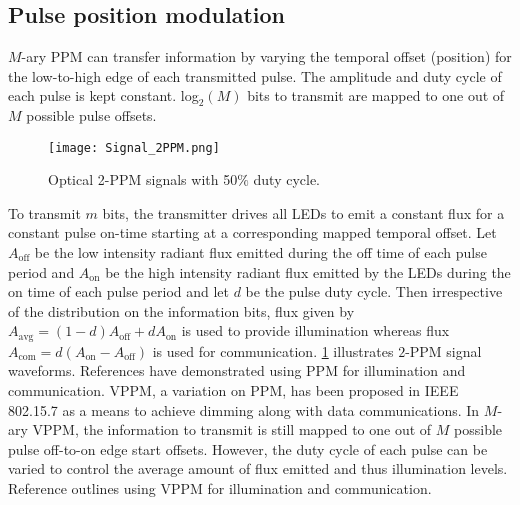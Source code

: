 \subsection{Pulse position modulation}
\label{subsec:sisoModulationPPM}
$M$-ary PPM can transfer information by varying the temporal offset (position) for the low-to-high edge of each transmitted pulse. The amplitude and duty cycle of each pulse is kept constant. log$^{ }_{2}(M)$ bits to transmit are mapped to one out of $M$ possible pulse offsets. 
\begin{figure}[!t]
	\centering
		\texttt{[image: Signal\_2PPM.png]}
		\caption[Optical PPM signals]{Optical 2-PPM signals with 50$\%$ duty cycle.}
		\label{fig:sisoSig2PPM}
\end{figure}
To transmit $m$ bits, the transmitter drives all LEDs to emit a constant flux for a constant pulse on-time starting at a corresponding mapped temporal offset. Let $A_{\text{off}}$ be the low intensity radiant flux emitted during the off time of each pulse period and $A_{\text{on}}$ be the high intensity radiant flux emitted by the LEDs during the on time of each pulse period and let $d$ be the pulse duty cycle. Then irrespective of the distribution on the information bits, flux given by $A_{\text{avg}} = (1-d)A_{\text{off}} + dA_{\text{on}}$ is used to provide illumination whereas flux $A_{\text{com}} = d(A_{\text{on}}-A_{\text{off}})$ is used for communication. \figurename{ \ref{fig:sisoSig2PPM}} illustrates $2$-PPM signal waveforms. References \cite{bai10a} have demonstrated using PPM for illumination and communication. VPPM, a variation on PPM, has been proposed in IEEE 802.15.7  as a means to achieve dimming along with data communications. In $M$-ary VPPM, the information to transmit is still mapped to one out of $M$ possible pulse off-to-on edge start offsets. However, the duty cycle of each pulse can be varied to control the average amount of flux emitted and thus illumination levels. Reference \cite{raj12a} outlines using VPPM for illumination and communication.

